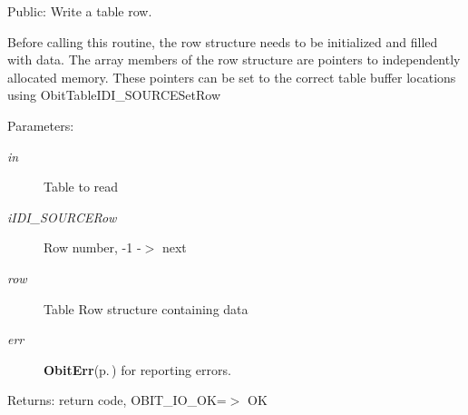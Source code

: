 Public: Write a table row. 

Before calling this routine, the row structure needs to be initialized and filled with data. The array members of the row structure are pointers to independently allocated memory. These pointers can be set to the correct table buffer locations using Obit\-Table\-IDI\_\-SOURCESet\-Row \begin{Desc}
\item[Parameters:]
\begin{description}
\item[{\em in}]Table to read \item[{\em i\-IDI\_\-SOURCERow}]Row number, -1 -$>$ next \item[{\em row}]Table Row structure containing data \item[{\em err}]{\bf Obit\-Err}{\rm (p.\,\pageref{structObitErr})} for reporting errors. \end{description}
\end{Desc}
\begin{Desc}
\item[Returns:]return code, OBIT\_\-IO\_\-OK=$>$ OK \end{Desc}
